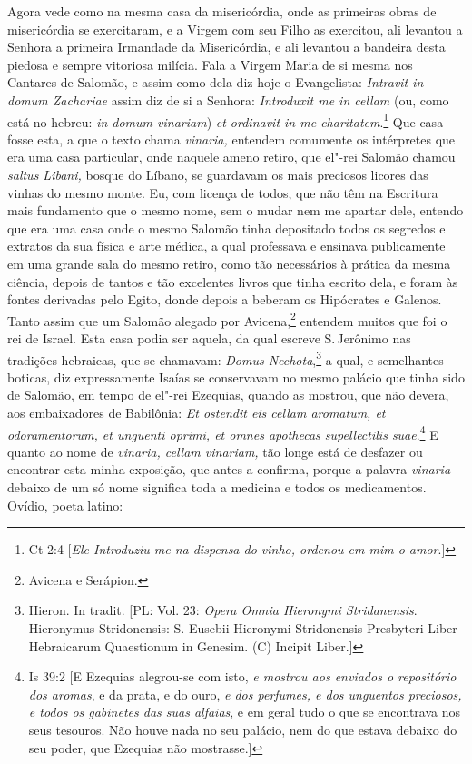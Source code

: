 Agora vede como na mesma casa da misericórdia, onde as primeiras obras
de misericórdia se exercitaram, e a Virgem com seu Filho as exercitou,
ali levantou a Senhora a primeira Irmandade da Misericórdia, e ali
levantou a bandeira desta piedosa e sempre vitoriosa milícia. Fala a
Virgem Maria de si mesma nos Cantares de Salomão, e assim como dela diz
hoje o Evangelista: \emph{Intravit in domum Zachariae} assim
diz de si a Senhora: \emph{Introduxit me in cellam} (ou, como está no
hebreu: \emph{in domum vinariam}) \emph{et ordinavit in me charitatem}.\footnote{Ct 2:4 [\textit{Ele Introduziu-me na dispensa do vinho, ordenou em mim o amor}.]} Que casa fosse esta, a que o texto chama \emph{vinaria,} entendem
comumente os intérpretes que era uma casa particular, onde naquele ameno
retiro, que el"-rei Salomão chamou \emph{saltus Libani,} bosque do
Líbano, se guardavam os mais preciosos licores das vinhas do mesmo
monte. Eu, com licença de todos, que não têm na Escritura mais
fundamento que o mesmo nome, sem o mudar nem me apartar dele, entendo
que era uma casa onde o mesmo Salomão tinha depositado todos os segredos
e extratos da sua física e arte médica, a qual professava e ensinava
publicamente em uma grande sala do mesmo retiro, como tão necessários à
prática da mesma ciência, depois de tantos e tão excelentes livros que
tinha escrito dela, e foram às fontes derivadas pelo Egito, donde depois
a beberam os Hipócrates e Galenos. Tanto assim que um Salomão alegado
por Avicena,\footnote{Avicena e Serápion.} entendem muitos que foi o rei de Israel.
Esta casa podia ser aquela, da qual escreve S.\,Jerônimo nas tradições
hebraicas, que se chamavam: \emph{Domus Nechota},\footnote{Hieron. In tradit. [PL: Vol. 23: \textit{Opera Omnia Hieronymi Stridanensis}. Hieronymus Stridonensis: S. Eusebii Hieronymi Stridonensis Presbyteri Liber Hebraicarum Quaestionum in Genesim. (C) Incipit Liber.]} a qual, e
semelhantes boticas, diz expressamente Isaías se conservavam no mesmo
palácio que tinha sido de Salomão, em tempo de el"-rei Ezequias, quando
as mostrou, que não devera, aos embaixadores de Babilônia: \emph{Et
ostendit eis cellam aromatum, et odoramentorum, et unguenti oprimi, et
omnes apothecas supellectilis suae}.\footnote{Is 39:2 [E Ezequias alegrou-se com isto, \textit{e mostrou aos enviados o repositório dos aromas}, e da prata, e do ouro, \textit{e dos perfumes, e dos unguentos preciosos, e todos os gabinetes das suas alfaias}, e em geral tudo o que se encontrava nos seus tesouros. Não houve nada no seu palácio, nem do que estava debaixo do seu poder, que Ezequias não mostrasse.]} E quanto ao nome de
\emph{vinaria, cellam vinariam,} tão longe está de desfazer ou encontrar
esta minha exposição, que antes a confirma, porque a palavra
\emph{vinaria} debaixo de um só nome significa toda a medicina e todos
os medicamentos. Ovídio, poeta latino:

